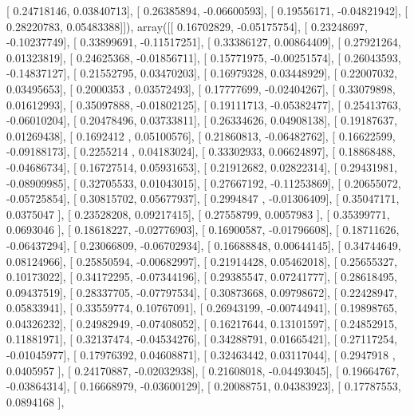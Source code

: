 \documentclass{article}
\begin{document}
       [ 0.24718146,  0.03840713],
       [ 0.26385894, -0.06600593],
       [ 0.19556171, -0.04821942],
       [ 0.28220783,  0.05483388]]), array([[ 0.16702829, -0.05175754],
       [ 0.23248697, -0.10237749],
       [ 0.33899691, -0.11517251],
       [ 0.33386127,  0.00864409],
       [ 0.27921264,  0.01323819],
       [ 0.24625368, -0.01856711],
       [ 0.15771975, -0.00251574],
       [ 0.26043593, -0.14837127],
       [ 0.21552795,  0.03470203],
       [ 0.16979328,  0.03448929],
       [ 0.22007032,  0.03495653],
       [ 0.2000353 ,  0.03572493],
       [ 0.17777699, -0.02404267],
       [ 0.33079898,  0.01612993],
       [ 0.35097888, -0.01802125],
       [ 0.19111713, -0.05382477],
       [ 0.25413763, -0.06010204],
       [ 0.20478496,  0.03733811],
       [ 0.26334626,  0.04908138],
       [ 0.19187637,  0.01269438],
       [ 0.1692412 ,  0.05100576],
       [ 0.21860813, -0.06482762],
       [ 0.16622599, -0.09188173],
       [ 0.2255214 ,  0.04183024],
       [ 0.33302933,  0.06624897],
       [ 0.18868488, -0.04686734],
       [ 0.16727514,  0.05931653],
       [ 0.21912682,  0.02822314],
       [ 0.29431981, -0.08909985],
       [ 0.32705533,  0.01043015],
       [ 0.27667192, -0.11253869],
       [ 0.20655072, -0.05725854],
       [ 0.30815702,  0.05677937],
       [ 0.2994847 , -0.01306409],
       [ 0.35047171,  0.0375047 ],
       [ 0.23528208,  0.09217415],
       [ 0.27558799,  0.0057983 ],
       [ 0.35399771,  0.0693046 ],
       [ 0.18618227, -0.02776903],
       [ 0.16900587, -0.01796608],
       [ 0.18711626, -0.06437294],
       [ 0.23066809, -0.06702934],
       [ 0.16688848,  0.00644145],
       [ 0.34744649,  0.08124966],
       [ 0.25850594, -0.00682997],
       [ 0.21914428,  0.05462018],
       [ 0.25655327,  0.10173022],
       [ 0.34172295, -0.07344196],
       [ 0.29385547,  0.07241777],
       [ 0.28618495,  0.09437519],
       [ 0.28337705, -0.07797534],
       [ 0.30873668,  0.09798672],
       [ 0.22428947,  0.05833941],
       [ 0.33559774,  0.10767091],
       [ 0.26943199, -0.00744941],
       [ 0.19898765,  0.04326232],
       [ 0.24982949, -0.07408052],
       [ 0.16217644,  0.13101597],
       [ 0.24852915,  0.11881971],
       [ 0.32137474, -0.04534276],
       [ 0.34288791,  0.01665421],
       [ 0.27117254, -0.01045977],
       [ 0.17976392,  0.04608871],
       [ 0.32463442,  0.03117044],
       [ 0.2947918 ,  0.0405957 ],
       [ 0.24170887, -0.02032938],
       [ 0.21608018, -0.04493045],
       [ 0.19664767, -0.03864314],
       [ 0.16668979, -0.03600129],
       [ 0.20088751,  0.04383923],
       [ 0.17787553,  0.0894168 ],
\end{document}

